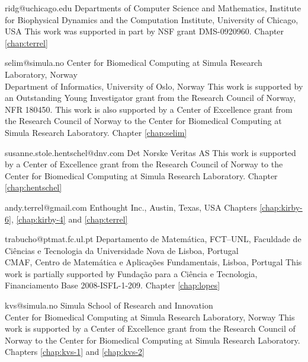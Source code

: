              {ridg@uchicago.edu}
             {Departments of Computer Science and Mathematics,
              Institute for Biophysical Dynamics and the Computation Institute,
              University of Chicago, USA}
             {This work was supported in part by NSF grant DMS-0920960.}
             {Chapter \ref{chap:terrel}}

             {selim@simula.no}
             {Center for Biomedical Computing at Simula Research Laboratory, Norway \\
              Department of Informatics, University of Oslo, Norway}
             {This work is supported by an Outstanding Young
              Investigator grant from the Research Council of Norway,
              NFR 180450. This work is also supported by a Center of
              Excellence grant from the Research Council of Norway to
              the Center for Biomedical Computing at Simula Research
              Laboratory.}
             {Chapter \ref{chap:selim}}

             {susanne.stole.hentschel@dnv.com}
             {Det Norske Veritas AS}
             {This work is supported by a Center of Excellence
              grant from the Research Council of Norway to the Center
              for Biomedical Computing at Simula Research
              Laboratory.}
             {Chapter \ref{chap:hentschel}}

             {andy.terrel@gmail.com}
             {Enthought Inc., Austin, Texas, USA}
             {}
             {Chapters
              \ref{chap:kirby-6},
              \ref{chap:kirby-4} and
              \ref{chap:terrel}}

             {trabucho@ptmat.fc.ul.pt}
             {Departamento de Matem\'{a}tica, FCT--UNL,
              Faculdade de Ci\^{e}ncias e Tecnologia da Universidade Nova de Lisboa, Portugal \\
              CMAF, Centro de Matem\'{a}tica e Aplica\c{c}\~{o}es Fundamentais, Lisboa, Portugal}
             {This work is partially supported by Funda\c{c}\~{a}o para a Ci\^{e}ncia e Tecnologia, Financiamento Base 2008-ISFL-1-209.}
             {Chapter \ref{chap:lopes}}

             {kvs@simula.no}
             {Simula School of Research and Innovation \\
              Center for Biomedical Computing at Simula Research Laboratory, Norway}
             {This work is supported by a Center of Excellence grant
              from the Research Council of Norway to the Center for
              Biomedical Computing at Simula Research Laboratory.}
             {Chapters \ref{chap:kvs-1} and \ref{chap:kvs-2}}

